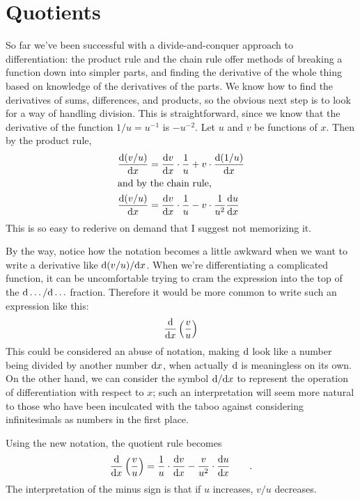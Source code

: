 \section{Quotients}

So far we've been successful with a divide-and-conquer approach to differentiation:
the product rule and the chain rule offer methods of breaking a function down into
simpler parts, and finding the derivative of the whole thing based on knowledge of
the derivatives of the parts. We know how to find the derivatives of sums, differences,
and products, so the obvious next step is to look for a way of handling division.
This is straightforward, since we know that the derivative of the function $1/u=u^{-1}$
is $-u^{-2}$.
Let $u$ and $v$ be functions of $x$. Then by the product rule,
\begin{align*}
  \frac{\textup{d}(v/u)}{\textup{d} x} &= \frac{\textup{d} v}{\textup{d} x}\cdot\frac{1}{u} + v\cdot \frac{\textup{d}(1/u)}{\textup{d} x} \\
\intertext{and by the chain rule,}
  \frac{\textup{d}(v/u)}{\textup{d} x} &= \frac{\textup{d} v}{\textup{d} x}\cdot\frac{1}{u} - v\cdot \frac{1}{u^2}\frac{\textup{d} u}{\textup{d} x}
\end{align*}
This is so easy to rederive on demand that I suggest not memorizing it.

By the way, notice how the notation becomes a little awkward when we want to write a derivative like
$\textup{d}(v/u)/\textup{d} x$. When we're differentiating a complicated function, it can be uncomfortable
trying to cram the expression into the top of the $\textup{d}\ldots/\textup{d}\ldots$ fraction. Therefore
it would be more common to write such an expression like this:
\begin{equation*}
  \frac{\textup{d}}{\textup{d} x} \left(\frac{v}{u}\right)
\end{equation*}
This could be considered an abuse of notation, making $\textup{d}$ look like a number being
divided by another number $\textup{d} x$, when actually $\textup{d}$ is meaningless on its own. On the other hand,
we can consider the symbol $\textup{d}/\textup{d} x$ to represent the operation of differentiation with respect to
$x$; such an interpretation will seem more natural to those who have been inculcated with the taboo
against considering infinitesimals as numbers in the first place.

Using the new notation, the quotient rule becomes
\begin{equation*}
  \frac{\textup{d}}{\textup{d} x} \left(\frac{v}{u}\right) = \frac{1}{u}\cdot\frac{\textup{d} v}{\textup{d} x} - \frac{v}{u^2} \cdot \frac{\textup{d} u}{\textup{d} x} \qquad .
\end{equation*}
The interpretation of the minus sign is that if $u$ increases, $v/u$ decreases.


